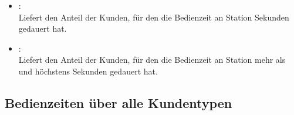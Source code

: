 \begin{itemize}
\item
{}:\\
Liefert den Anteil der Kunden, für den die Bedienzeit an Station   Sekunden gedauert hat.

\item
{}:\\
Liefert den Anteil der Kunden, für den die Bedienzeit an Station  mehr als  und höchstens  Sekunden gedauert hat.

\end{itemize}



\subsection{Bedienzeiten über alle Kundentypen}

